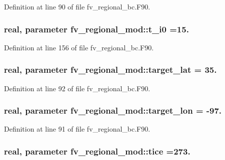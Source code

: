 Definition at line 90 of file fv\-\_\-regional\-\_\-bc.\-F90.

\subsubsection[{t\-\_\-i0}]{\setlength{\rightskip}{0pt plus 5cm}real, parameter fv\-\_\-regional\-\_\-mod\-::t\-\_\-i0 =15.\hspace{0.3cm}{\ttfamily [private]}}\label{classfv__regional__mod_ab891456d653e8b3dba04c9a553877b22}


Definition at line 156 of file fv\-\_\-regional\-\_\-bc.\-F90.

\subsubsection[{target\-\_\-lat}]{\setlength{\rightskip}{0pt plus 5cm}real, parameter fv\-\_\-regional\-\_\-mod\-::target\-\_\-lat = 35.\hspace{0.3cm}{\ttfamily [private]}}\label{classfv__regional__mod_aaf300439aa3eac86faaf7f26f41e1bcd}


Definition at line 92 of file fv\-\_\-regional\-\_\-bc.\-F90.

\subsubsection[{target\-\_\-lon}]{\setlength{\rightskip}{0pt plus 5cm}real, parameter fv\-\_\-regional\-\_\-mod\-::target\-\_\-lon = -\/97.\hspace{0.3cm}{\ttfamily [private]}}\label{classfv__regional__mod_afad48457183ea13095892d3d0831cecb}


Definition at line 91 of file fv\-\_\-regional\-\_\-bc.\-F90.

\subsubsection[{tice}]{\setlength{\rightskip}{0pt plus 5cm}real, parameter fv\-\_\-regional\-\_\-mod\-::tice =273.\hspace{0.3cm}{\ttfamily [private]}}\label{classfv__regional__mod_a234b3fd9ee427db8de0880bc4f5849c9}


